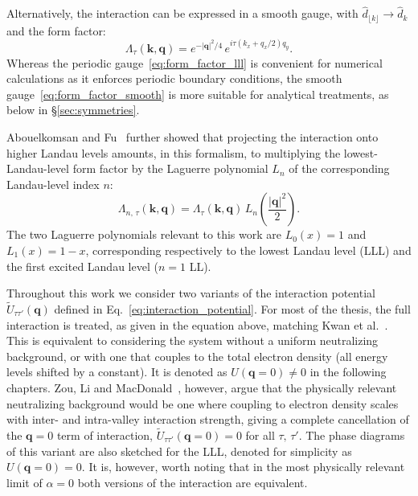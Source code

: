 Alternatively, the interaction can be expressed in a smooth gauge, with $\hat{d}_{\lfloor k \rfloor} \to \hat{d}_k$ and the form factor:
\begin{equation}
    \Lambda_\tau(\mathbf{k}, \mathbf{q}) = e^{-|\mathbf{q}|^2/4} \, e^{i \tau (k_x + q_x/2) q_y}.
    \label{eq:form_factor_smooth}
\end{equation}
Whereas the periodic gauge~\eqref{eq:form_factor_lll} is convenient for numerical calculations as it enforces periodic boundary conditions, the smooth gauge~\eqref{eq:form_factor_smooth} is more suitable for analytical treatments, as below in \S\ref{sec:symmetries}.

Abouelkomsan and Fu~\cite{abouelkomsan2025non} further showed that projecting the interaction onto higher Landau levels amounts, in this formalism, to multiplying the lowest-Landau-level form factor by the Laguerre polynomial $L_n$ of the corresponding Landau-level index $n$:
\begin{equation}
    \Lambda_{n, \, \tau}(\mathbf{k}, \mathbf{q}) = \Lambda_\tau(\mathbf{k}, \mathbf{q}) \, L_n\!\left( \frac{|\mathbf{q}|^2}{2} \right).
    \label{eq:form_factor_general}
\end{equation}
The two Laguerre polynomials relevant to this work are $L_0(x) = 1$ and $L_1(x) = 1-x$, corresponding respectively to the lowest Landau level (LLL) and the first excited Landau level ($n=1$ LL).

Throughout this work we consider two variants of the interaction potential $\tilde{U}_{\tau \tau'}(\mathbf{q})$ defined in Eq.~\eqref{eq:interaction_potential}. For most of the thesis, the full interaction is treated, as given in the equation above, matching Kwan et al.~\cite{kwan2025textured}. This is equivalent to considering the system without a uniform neutralizing background, or with one that couples to the total electron density (all energy levels shifted by a constant). It is denoted as $U(\mathbf{q}=0) \neq 0$ in the following chapters.
Zou, Li and MacDonald~\cite{kl58-rj3r}, however, argue that the physically relevant neutralizing background would be one where coupling to electron density scales with inter- and intra-valley interaction strength, giving a complete cancellation of the $\mathbf{q}=0$ term of interaction, $\tilde{U}_{\tau \tau'}(\mathbf{q} = 0) = 0$ for all $\tau,\, \tau'$. The phase diagrams of this variant are also sketched for the LLL, denoted for simplicity as $U(\mathbf{q}=0) = 0$. It is, however, worth noting that in the most physically relevant limit of $\alpha = 0$ both versions of the interaction are equivalent.

